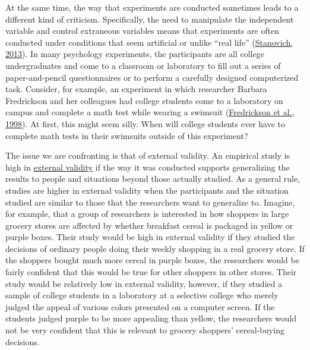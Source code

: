 \documentclass[
]{krantz}
\begin{document}
At the same time, the way that experiments are conducted sometimes leads to a different kind of criticism. Specifically, the need to manipulate the independent variable and control extraneous variables means that experiments are often conducted under conditions that seem artificial or unlike ``real life'' (\protect\hyperlink{ref-stanovich2013think}{Stanovich, 2013}). In many psychology experiments, the participants are all college undergraduates and come to a classroom or laboratory to fill out a series of paper-and-pencil questionnaires or to perform a carefully designed computerized task. Consider, for example, an experiment in which researcher Barbara Fredrickson and her colleagues had college students come to a laboratory on campus and complete a math test while wearing a swimsuit (\protect\hyperlink{ref-fredrickson1998swimsuit}{Fredrickson et al., 1998}). At first, this might seem silly. When will college students ever have to complete math tests in their swimsuits outside of this experiment?

The issue we are confronting is that of external validity. An empirical study is high in \protect\hyperlink{external-validity-2}{external validity} if the way it was conducted supports generalizing the results to people and situations beyond those actually studied. As a general rule, studies are higher in external validity when the participants and the situation studied are similar to those that the researchers want to generalize to. Imagine, for example, that a group of researchers is interested in how shoppers in large grocery stores are affected by whether breakfast cereal is packaged in yellow or purple boxes. Their study would be high in external validity if they studied the decisions of ordinary people doing their weekly shopping in a real grocery store. If the shoppers bought much more cereal in purple boxes, the researchers would be fairly confident that this would be true for other shoppers in other stores. Their study would be relatively low in external validity, however, if they studied a sample of college students in a laboratory at a selective college who merely judged the appeal of various colors presented on a computer screen. If the students judged purple to be more appealing than yellow, the researchers would not be very confident that this is relevant to grocery shoppers' cereal-buying decisions.
\end{document}
